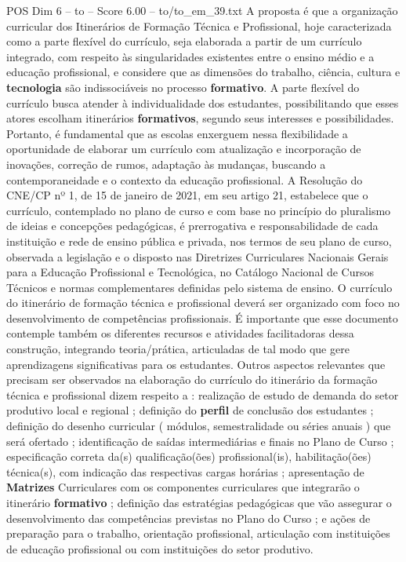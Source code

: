 \begin{textsample}{POS Dim 6 – to – Score 6.00 – to/to\_em\_39.txt}
A proposta é que a organização curricular dos Itinerários de Formação Técnica e Profissional, hoje caracterizada como a parte flexível do currículo, seja elaborada a partir de um currículo integrado, com respeito às singularidades existentes entre o ensino médio e a educação profissional, e considere que as dimensões do trabalho, ciência, cultura e \textbf{tecnologia} são indissociáveis no processo \textbf{formativo}.
A parte flexível do currículo busca atender à individualidade dos estudantes, possibilitando que esses atores escolham itinerários \textbf{formativos}, segundo seus interesses e possibilidades.
Portanto, é fundamental que as escolas enxerguem nessa flexibilidade a oportunidade de elaborar um currículo com atualização e incorporação de inovações, correção de rumos, adaptação às mudanças, buscando a contemporaneidade e o contexto da educação profissional.
A Resolução do CNE/CP nº 1, de 15 de janeiro de 2021, em seu artigo 21, estabelece que o currículo, contemplado no plano de curso e com base no princípio do pluralismo de ideias e concepções pedagógicas, é prerrogativa e responsabilidade de cada instituição e rede de ensino pública e privada, nos termos de seu plano de curso, observada a legislação e o disposto nas Diretrizes Curriculares Nacionais Gerais para a Educação Profissional e Tecnológica, no Catálogo Nacional de Cursos Técnicos e normas complementares definidas pelo sistema de ensino.
O currículo do itinerário de formação técnica e profissional deverá ser organizado com foco no desenvolvimento de competências profissionais.
É importante que esse documento contemple também os diferentes recursos e atividades facilitadoras dessa construção, integrando teoria/prática, articuladas de tal modo que gere aprendizagens significativas para os estudantes.
Outros aspectos relevantes que precisam ser observados na elaboração do currículo do itinerário da formação técnica e profissional dizem respeito a : realização de estudo de demanda do setor produtivo local e regional ; definição do \textbf{perfil} de conclusão dos estudantes ; definição do desenho curricular ( módulos, semestralidade ou séries anuais ) que será ofertado ; identificação de saídas intermediárias e finais no Plano de Curso ; especificação correta da(s) qualificação(ões) profissional(is), habilitação(ões) técnica(s), com indicação das respectivas cargas horárias ; apresentação de \textbf{Matrizes} Curriculares com os componentes curriculares que integrarão o itinerário \textbf{formativo} ; definição das estratégias pedagógicas que vão assegurar o desenvolvimento das competências previstas no Plano do Curso ; e ações de preparação para o trabalho, orientação profissional, articulação com instituições de educação profissional ou com instituições do setor produtivo.

\end{textsample}
